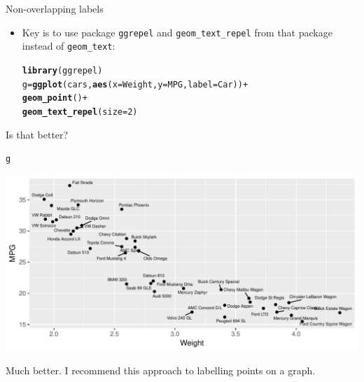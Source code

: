 \documentclass[unknownkeysallowed]{beamer}\usepackage[]{graphicx}\usepackage[]{color}
\makeatletter
\def\maxwidth{ %
  \ifdim\Gin@nat@width>\linewidth
    \linewidth
  \else
    \Gin@nat@width
  \fi
}
\newcommand{\hlnum}[1]{\textcolor[rgb]{0.686,0.059,0.569}{#1}}%
\newcommand{\hlopt}[1]{\textcolor[rgb]{0,0,0}{#1}}%
\newcommand{\hlstd}[1]{\textcolor[rgb]{0.345,0.345,0.345}{#1}}%
\newcommand{\hlkwb}[1]{\textcolor[rgb]{0.69,0.353,0.396}{#1}}%
\newcommand{\hlkwc}[1]{\textcolor[rgb]{0.333,0.667,0.333}{#1}}%
\newcommand{\hlkwd}[1]{\textcolor[rgb]{0.737,0.353,0.396}{\textbf{#1}}}%
\newenvironment{kframe}{%
 \def\at@end@of@kframe{}%
 \ifinner\ifhmode%
  \def\at@end@of@kframe{\end{minipage}}%
  \begin{minipage}{\columnwidth}%
 \fi\fi%
 \def\FrameCommand##1{\hskip\@totalleftmargin \hskip-\fboxsep
 \colorbox{shadecolor}{##1}\hskip-\fboxsep
     \hskip-\linewidth \hskip-\@totalleftmargin \hskip\columnwidth}%
 \MakeFramed {\advance\hsize-\width
   \@totalleftmargin\z@ \linewidth\hsize
   \@setminipage}}%
 {\par\unskip\endMakeFramed%
 \at@end@of@kframe}
\newenvironment{knitrout}{}{} %
\makeatother
\begin{document}
\begin{frame}[fragile]{Non-overlapping labels}
  
  \begin{itemize}
  \item Key is to use package \texttt{ggrepel} and
    \verb+geom_text_repel+ from that package instead of \verb+geom_text+:

\begin{knitrout}
\color{fgcolor}\begin{kframe}
\begin{alltt}
\hlkwd{library}\hlstd{(ggrepel)}
\hlstd{g}\hlkwb{=}\hlkwd{ggplot}\hlstd{(cars,}\hlkwd{aes}\hlstd{(}\hlkwc{x}\hlstd{=Weight,}\hlkwc{y}\hlstd{=MPG,}\hlkwc{label}\hlstd{=Car))}\hlopt{+}
  \hlkwd{geom_point}\hlstd{()}\hlopt{+}
  \hlkwd{geom_text_repel}\hlstd{(}\hlkwc{size}\hlstd{=}\hlnum{2}\hlstd{)}
\end{alltt}
\end{kframe}
\end{knitrout}
  \end{itemize}
  
\end{frame}

\begin{frame}[fragile]{Is that better?}
  
\begin{knitrout}
\color{fgcolor}\begin{kframe}
\begin{alltt}
\hlstd{g}
\end{alltt}
\end{kframe}
\includegraphics[width=\maxwidth]{figure/unnamed-chunk-418-1} 

\end{knitrout}

Much better. I recommend this approach to labelling points on a graph.
  
\end{frame}
\end{document}
